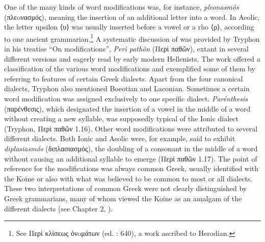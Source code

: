 One of the many kinds of word modifications was, for instance, \textit{pleonasmós} (πλεoνασμός), meaning the insertion of an additional letter into a word. In Aeolic, the letter upsilon ⟨υ⟩ was usually inserted before a vowel or a rho ⟨ρ⟩, according to one ancient grammarian.\footnote{{See Περὶ κλίσεως ὀνoμάτων (ed. \citealt{Lentz1870}: 640), a work ascribed to Herodian.}} A systematic discussion of  was provided by Tryphon in his treatise “On modifications”, \textit{Perì pathôn} (Περὶ παθῶν), extant in several different versions and eagerly read by early modern Hellenists. The work offered a classification of the various word modifications and exemplified some of them by referring to features of certain Greek dialects. Apart from the four canonical dialects, Tryphon also mentioned Boeotian and Laconian. Sometimes a certain word modification was assigned exclusively to one specific dialect. \textit{Parénthesis} (παρένθεσις), which designated the insertion of a vowel in the middle of a word without creating a new syllable, was supposedly typical of the Ionic dialect (Tryphon, Περὶ παθῶν 1.16). Other word modifications were attributed to several different dialects. Both Ionic and Aeolic were, for example, said to exhibit \textit{diplasiasmós} (διπλασιασμός), the doubling of a consonant in the middle of a word without causing an additional syllable to emerge (Περὶ παθῶν 1.17). The point of reference for the modifications was always common Greek, usually identified with the Koine or also with what was believed to be common to most or all dialects. These two interpretations of common Greek were not clearly distinguished by Greek grammarians, many of whom viewed the Koine as an amalgam of the different dialects (see Chapter 2, ).




